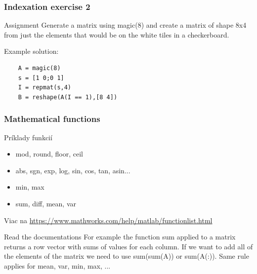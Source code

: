 \documentclass{beamer}
\begin{document}
\begin{frame}[fragile]
\frametitle{Indexation exercise 2}
 
  \begin{block}{Assignment}
  Generate a matrix using magic(8) and create a matrix of shape 8x4 from just the elements that would be on the white tiles in a checkerboard.
  \end{block}
  
  \noindent{}  
  
  \pause
  
  \begin{block}{Example solution:}
  \begin{verbatim}
    A = magic(8)
    s = [1 0;0 1]
    I = repmat(s,4)
    B = reshape(A(I == 1),[8 4]) \end{verbatim}
  \end{block}  
\end{frame}

\begin{frame}
\frametitle{Mathematical functions}
 
  \begin{block}{Príklady funkcií}
    \begin{itemize}
      \item mod, round, floor, ceil
      \item abs, sgn, exp, log, sin, cos, tan, asin...
      \item min, max
      \item sum, diff, mean, var
    \end{itemize}
  \end{block}
 
  Viac na \url{https://www.mathworks.com/help/matlab/functionlist.html}
  
  \begin{alertblock}{Read the documentations}
  For example the function sum applied to a matrix returns a row vector with sums of values for each column. If we want to add all of the elements of the matrix we need to use sum(sum(A)) or sum(A(:)). Same rule applies for mean, var, min, max, ...
  \end{alertblock}  
\end{frame}
\end{document}
